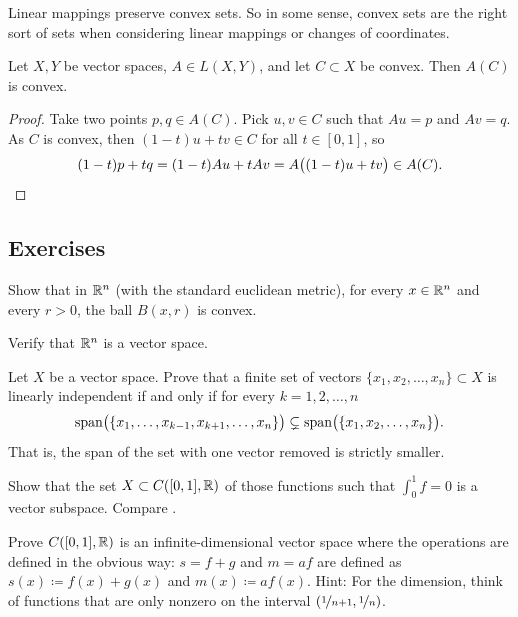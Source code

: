 Linear mappings preserve convex sets.  So in some sense, convex sets are the
right sort of sets when considering linear mappings or changes of
coordinates.

\begin{prop}
Let $X,Y$ be vector spaces, $A \in L(X,Y)$, and let $C \subset X$ be convex.
Then $A(C)$ is convex.
\end{prop}

\begin{proof}
Take two points $p,q \in A(C)$.  Pick $u,v \in C$ such that
$Au = p$ and $Av=q$.  As $C$ is convex, then
$(1-t)u+t v \in C$
for all $t \in [0,1]$, so
\begin{equation*}
(1-t)p+t q 
=
(1-t)Au+tAv
=
A\bigl((1-t)u+tv\bigr)
\in A(C) .  \qedhere
\end{equation*}
\end{proof}


\subsection{Exercises}

\begin{exercise}
Show that in ${\mathbb{R}}^n$
(with the standard euclidean metric),
for every $x \in {\mathbb{R}}^n$ and every $r > 0$,
the ball $B(x,r)$ is convex.
\end{exercise}


\begin{exercise}
Verify that ${\mathbb{R}}^n$ is a vector space.
\end{exercise}

\begin{exercise}
Let $X$ be a vector space.
Prove that a finite set of vectors $\{ x_1,x_2,\ldots,x_n \} \subset X$ 
is linearly independent if and only if for every $k=1,2,\ldots,n$
\begin{equation*}
\operatorname{span}\bigl( \{ x_1,\ldots,x_{k-1},x_{k+1},\ldots,x_n \}\bigr) \subsetneq
\operatorname{span}\bigl( \{ x_1,x_2,\ldots,x_n \}\bigr) .
\end{equation*}
That is, the span of the set with one vector removed is strictly smaller.
\end{exercise}

\begin{exercise} \label{exercise:intzerosubspace}
Show that the set $X \subset C([0,1],{\mathbb{R}})$ of those functions such 
that $\int_0^1 f = 0$ is a vector subspace.
Compare .
\end{exercise}

\begin{exercise}[Challenging]
Prove $C([0,1],{\mathbb{R}})$ is an infinite-dimensional vector space
where the operations are defined in the obvious way:
$s=f+g$ and $m=af$ are defined as
$s(x) \coloneqq f(x)+g(x)$ and
$m(x) \coloneqq a f(x)$.
Hint: For the dimension, think of functions that are only nonzero
on the interval $(\nicefrac{1}{n+1},\nicefrac{1}{n})$.
\end{exercise}


